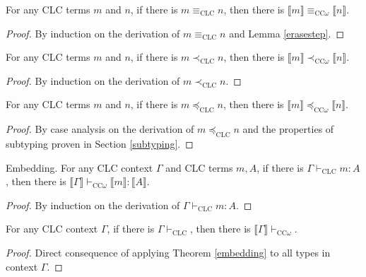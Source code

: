 \documentclass[sigplan,screen,review,anonymous]{acmart}
\newcommand{\erase}[1]{\llbracket #1 \rrbracket}
\begin{document}
\begin{lemma}
  For any CLC terms $m$ and $n$, if there is $m \equiv_{\scriptscriptstyle \text{CLC}} n$, then there is $\erase{m} \equiv_{\scriptscriptstyle \text{CC$\omega$}} \erase{n}$.
\end{lemma}
\begin{proof}
  By induction on the derivation of $m \equiv_{\scriptscriptstyle \text{CLC}} n$ and Lemma \ref{erasestep}.
\end{proof}

\begin{lemma}\label{erasesub1}
  For any CLC terms $m$ and $n$, if there is $m \prec_{\scriptscriptstyle \text{CLC}} n$, then there is $\erase{m} \prec_{\scriptscriptstyle \text{CC$\omega$}} \erase{n}$.
\end{lemma}
\begin{proof}
  By induction on the derivation of $m \prec_{\scriptscriptstyle \text{CLC}} n$.
\end{proof}

\begin{lemma}
  For any CLC terms $m$ and $n$, if there is $m \preceq_{\scriptscriptstyle \text{CLC}} n$, then there is $\erase{m} \preceq_{\scriptscriptstyle \text{CC$\omega$}} \erase{n}$.
\end{lemma}
\begin{proof}
  By case analysis on the derivation of $m \preceq_{\scriptscriptstyle \text{CLC}} n$ and the properties of subtyping proven in Section \ref{subtyping}.
\end{proof}

\begin{theorem}\label{embedding}
  Embedding. For any CLC context $\Gamma$ and CLC terms $m, A$, if there is $\Gamma \vdash_{\scriptscriptstyle \text{CLC}} m : A$, then there is $\erase{\Gamma} \vdash_{\scriptscriptstyle \text{CC$\omega$}} \erase{m} : \erase{A}$.
\end{theorem}
\begin{proof}
  By induction on the derivation of $\Gamma \vdash_{\scriptscriptstyle \text{CLC}} m : A$.
\end{proof}

\begin{corollary}\label{embeddingcontext}
  For any CLC context $\Gamma$, if there is $\Gamma \vdash_{\scriptscriptstyle \text{CLC}}$, then there is $\erase{\Gamma} \vdash_{\scriptscriptstyle \text{CC$\omega$}}$.
\end{corollary}
\begin{proof}
  Direct consequence of applying Theorem \ref{embedding} to all types in context $\Gamma$.
\end{proof}
\end{document}
